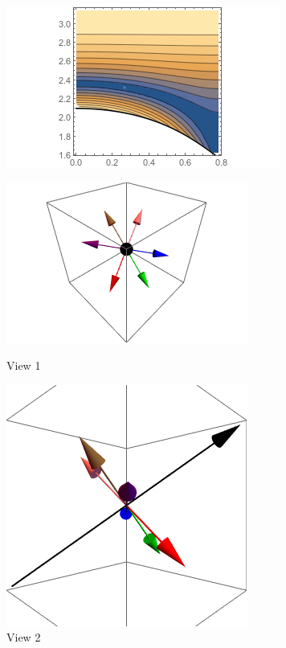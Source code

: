 \begin{figure}
	\includegraphics[scale=1]{img/th2-3108_phi0-27_plane.png}
\end{figure}
\begin{figure}
  \begin{minipage}[b]{0.5\linewidth}
    \centering
    \includegraphics[width=.8\linewidth]{img/th2-3108_phi0-27_view1.png} 
    \caption{View 1} 
    \vspace{4ex}
  \end{minipage}%
  \begin{minipage}[b]{0.5\linewidth}
    \centering
    \includegraphics[width=.5\linewidth]{img/th2-3108_phi0-27_view2.png} 
    \caption{View 2} 
    \vspace{4ex}

\end{minipage}
\end{figure}
